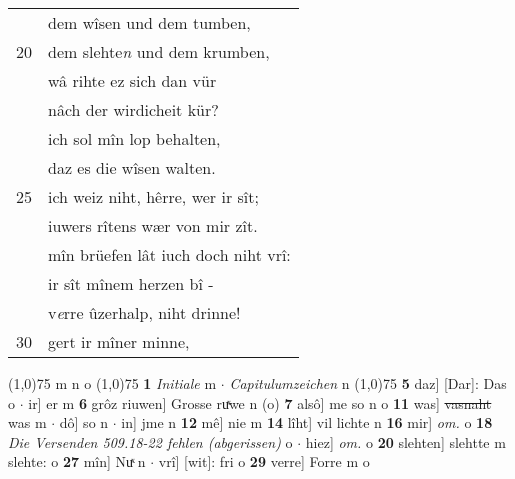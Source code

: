 \documentclass[8pt,a4paper,notitlepage]{article}
\begin{document}
\begin{table}[ht]
\begin{minipage}[t]{0.5\linewidth}
\begin{tabular}{rl}
 & dem wîsen und dem tumben,\\ 
20 & dem slehte\textit{n} und dem krumben,\\ 
 & wâ rihte ez sich dan vür\\ 
 & nâch der wirdicheit kür?\\ 
 & ich sol mîn lop behalten,\\ 
 & daz es die wîsen walten.\\ 
25 & ich weiz niht, hêrre, wer ir sît;\\ 
 & iuwers rîtens wær von mir zît.\\ 
 & mîn brüefen lât iuch doch niht vrî:\\ 
 & ir sît mînem herzen bî -\\ 
 & v\textit{e}rre ûzerhalp, niht drinne!\\ 
30 & gert ir mîner minne,\\ 
\end{tabular}
\scriptsize
\line(1,0){75} \newline
m n o \newline
\line(1,0){75} \newline
\textbf{1} \textit{Initiale} m   $\cdot$ \textit{Capitulumzeichen} n  \newline
\line(1,0){75} \newline
\textbf{5} daz] [Dar]: Das o  $\cdot$ ir] er m \textbf{6} grôz riuwen] Grosse ruͯwe n (o) \textbf{7} alsô] me so n o \textbf{11} was] \sout{vasnaht} was m  $\cdot$ dô] so n  $\cdot$ in] jme n \textbf{12} mê] nie m \textbf{14} lîht] vil lichte n \textbf{16} mir] \textit{om.} o \textbf{18} \textit{Die Versenden 509.18-22 fehlen (abgerissen)} o   $\cdot$ hiez] \textit{om.} o \textbf{20} slehten] slehtte m slehte: o \textbf{27} mîn] Nuͯ n  $\cdot$ vrî] [wit]: fri o \textbf{29} verre] Forre m o \newline
\end{minipage}
\end{table}
\newpage
\end{document}
